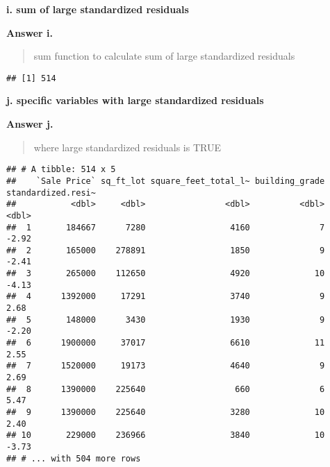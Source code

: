 \documentclass[
]{article}
\newenvironment{Shaded}{\begin{snugshade}}{\end{snugshade}}
\newcommand{\KeywordTok}[1]{\textcolor[rgb]{0.13,0.29,0.53}{\textbf{#1}}}
\newcommand{\NormalTok}[1]{#1}
\newcommand{\OperatorTok}[1]{\textcolor[rgb]{0.81,0.36,0.00}{\textbf{#1}}}
\newcommand{\StringTok}[1]{\textcolor[rgb]{0.31,0.60,0.02}{#1}}
\begin{document}
\textbf{i. sum of large standardized residuals }

\textbf{Answer i.}

\begin{quote}
sum function to calculate sum of large standardized residuals
\end{quote}

\begin{Shaded}
\end{Shaded}

\begin{verbatim}
## [1] 514
\end{verbatim}

\textbf{j. specific variables with large standardized residuals }

\textbf{Answer j.}

\begin{quote}
where large standardized residuals is TRUE
\end{quote}

\begin{Shaded}
\end{Shaded}

\begin{verbatim}
## # A tibble: 514 x 5
##    `Sale Price` sq_ft_lot square_feet_total_l~ building_grade standardized.resi~
##           <dbl>     <dbl>                <dbl>          <dbl>              <dbl>
##  1       184667      7280                 4160              7              -2.92
##  2       165000    278891                 1850              9              -2.41
##  3       265000    112650                 4920             10              -4.13
##  4      1392000     17291                 3740              9               2.68
##  5       148000      3430                 1930              9              -2.20
##  6      1900000     37017                 6610             11               2.55
##  7      1520000     19173                 4640              9               2.69
##  8      1390000    225640                  660              6               5.47
##  9      1390000    225640                 3280             10               2.40
## 10       229000    236966                 3840             10              -3.73
## # ... with 504 more rows
\end{verbatim}
\end{document}
